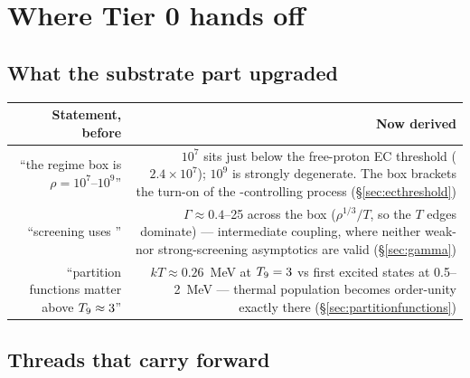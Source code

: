 %
\section*{Where Tier 0 hands off}
\label{sec:handoff}

\subsection*{What the substrate part upgraded}

\begin{center}
\small
\begin{tabularx}{\textwidth}{@{}R{0.6} R{1.4}@{}}
\toprule
\textbf{Statement, before} & \textbf{Now derived} \\
\midrule
``the regime box is $\rho = 10^{7}$--$10^{9}$'' &
  $10^{7}$ sits just below the free-proton EC threshold
  ($2.4\times10^{7}$); $10^{9}$ is strongly degenerate. The box brackets the
  turn-on of the \Ye{}-controlling process (\S\ref{sec:ecthreshold}) \\
``screening uses '' &
  $\Gamma \approx 0.4$--25 across the box ($\rho^{1/3}/T$, so the $T$ edges
  dominate) --- intermediate coupling, where neither weak- nor strong-screening
  asymptotics are valid (\S\ref{sec:gamma}) \\
``partition functions matter above $T_{9} \approx 3$'' &
  $kT \approx 0.26$~MeV at $T_{9} = 3$ vs first excited states at 0.5--2~MeV ---
  thermal population becomes order-unity exactly there
  (\S\ref{sec:partitionfunctions}) \\
\bottomrule
\end{tabularx}
\end{center}

\subsection*{Threads that carry forward}

